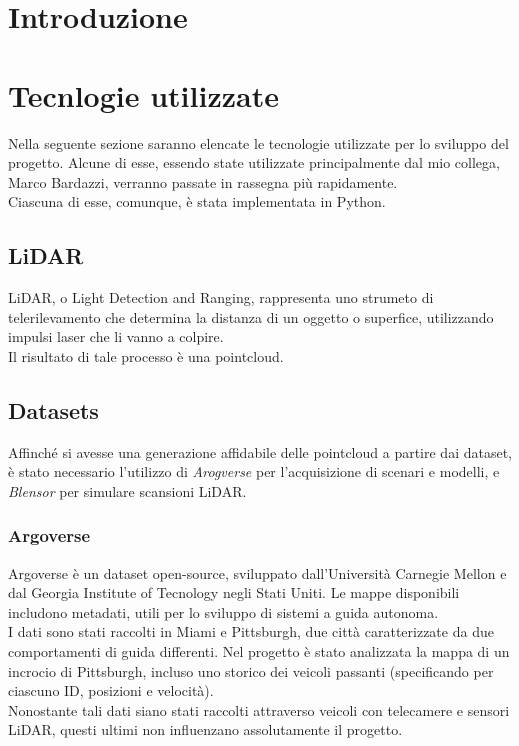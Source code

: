 \documentclass[italian]{article}
\begin{document}
\section*{Introduzione}
\section*{Tecnlogie utilizzate}
Nella seguente sezione saranno elencate le tecnologie utilizzate per lo sviluppo del progetto. Alcune di esse, essendo state utilizzate principalmente dal mio collega, Marco Bardazzi, verranno passate in rassegna più rapidamente.\\
Ciascuna di esse, comunque, è stata implementata in Python.
\subsection{LiDAR}
LiDAR, o Light Detection and Ranging, rappresenta uno strumeto di telerilevamento che determina la distanza di un oggetto o superfice, utilizzando impulsi laser che li vanno a colpire.\\
Il risultato di tale processo è una pointcloud.
\subsection{Datasets}
Affinché si avesse una generazione affidabile delle pointcloud a partire dai dataset, è stato necessario l'utilizzo di \textit{Arogverse} per l'acquisizione di scenari e modelli, e \textit{Blensor} per simulare scansioni LiDAR.\\
\subsubsection{Argoverse}
Argoverse è un dataset open-source, sviluppato dall'Università Carnegie Mellon e dal Georgia Institute of Tecnology negli Stati Uniti. Le mappe disponibili includono metadati, utili per lo sviluppo di sistemi a guida autonoma.\\
I dati sono stati raccolti in Miami e Pittsburgh, due città caratterizzate da due comportamenti di guida differenti. Nel progetto è stato analizzata la mappa di un incrocio di Pittsburgh, incluso uno storico dei veicoli passanti (specificando per ciascuno ID, posizioni e velocità).\\
Nonostante tali dati siano stati raccolti attraverso veicoli con telecamere e sensori LiDAR, questi ultimi non influenzano assolutamente il progetto.
\end{document}
